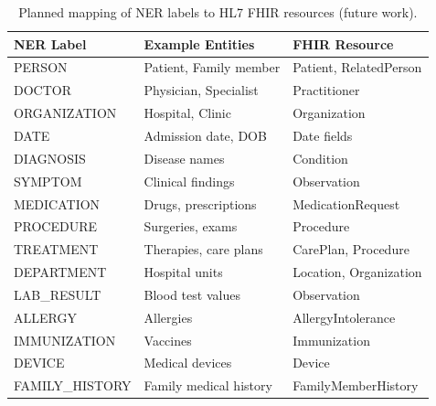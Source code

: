 \documentclass[conference]{IEEEtran}
\begin{document}
\begin{table}[htbp]
\centering
\caption{Planned mapping of NER labels to HL7 FHIR resources (future work).}
\begin{tabular}{@{}p{3cm}p{5cm}p{5cm}@{}}  %
\toprule
\textbf{NER Label} & \textbf{Example Entities} & \textbf{FHIR Resource} \\
\midrule
PERSON          & Patient, Family member        & Patient, RelatedPerson \\
DOCTOR          & Physician, Specialist         & Practitioner \\
ORGANIZATION    & Hospital, Clinic              & Organization \\
DATE            & Admission date, DOB           & Date fields \\
DIAGNOSIS       & Disease names                 & Condition \\
SYMPTOM         & Clinical findings             & Observation \\
MEDICATION      & Drugs, prescriptions          & MedicationRequest \\
PROCEDURE       & Surgeries, exams              & Procedure \\
TREATMENT       & Therapies, care plans         & CarePlan, Procedure \\
DEPARTMENT      & Hospital units                & Location, Organization \\
LAB\_RESULT     & Blood test values             & Observation \\
ALLERGY         & Allergies                     & AllergyIntolerance \\
IMMUNIZATION    & Vaccines                      & Immunization \\
DEVICE          & Medical devices               & Device \\
FAMILY\_HISTORY & Family medical history        & FamilyMemberHistory \\
\bottomrule
\end{tabular}
\label{tab:fhir}
\end{table}
\twocolumn
\end{document}
